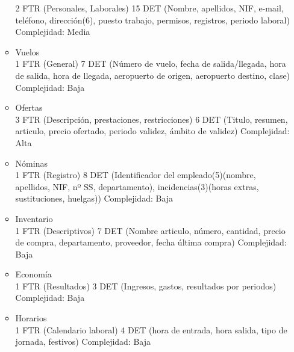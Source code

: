 \begin{enumerate}
\begin{itemize}
			2 FTR (Personales, Laborales)
			15 DET (Nombre, apellidos, NIF, e-mail, teléfono, dirección(6), puesto trabajo, permisos, registros, periodo laboral)
			Complejidad: Media\\
		\item Vuelos\\
			1 FTR (General)
			7 DET (Número de vuelo, fecha de salida/llegada, hora de salida, hora de llegada, aeropuerto de origen, aeropuerto destino,
			clase)
			Complejidad: Baja\\
		\item Ofertas\\
			3 FTR (Descripción, prestaciones, restricciones)
			6 DET (Titulo, resumen, articulo, precio ofertado, periodo validez, ámbito de validez)
			Complejidad: Alta\\
		\item Nóminas\\
			1 FTR (Registro)
			8 DET (Identificador del empleado(5)(nombre, apellidos, NIF, nº SS, departamento), incidencias(3)(horas extras,
			sustituciones, huelgas))
			Complejidad: Baja\\
		\item Inventario\\
			1 FTR (Descriptivos)
			7 DET (Nombre articulo, número, cantidad, precio de compra, departamento, proveedor, fecha última compra)
			Complejidad: Baja\\
		\item Economía\\
			1 FTR (Resultados)
			3 DET (Ingresos, gastos, resultados por periodos)
			Complejidad: Baja\\
		\item Horarios\\
			1 FTR (Calendario laboral)
			4 DET (hora de entrada, hora salida, tipo de jornada, festivos)
			Complejidad: Baja\\
	\end{itemize}



\end{enumerate}

